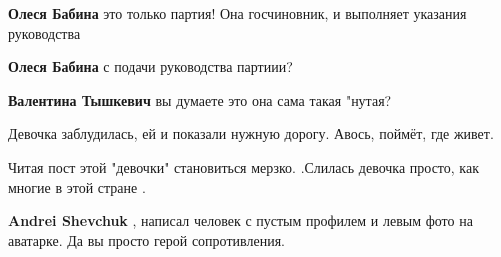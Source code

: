 \begin{itemize}
\begin{itemize}
 
\textbf{Олеся Бабина} это только партия! Она госчиновник, и выполняет указания руководства

 
\textbf{Олеся Бабина} с подачи руководства партиии?

 
\textbf{Валентина Тышкевич} вы думаете это она сама такая "нутая?
\end{itemize}

 
Девочка заблудилась, ей и показали нужную дорогу. Авось, поймёт, где живет.

 
Читая пост этой "девочки" становиться мерзко. .Слилась девочка просто, как многие в этой стране .

\begin{itemize}
 
\textbf{Andrei Shevchuk} , написал человек с пустым профилем и левым фото на аватарке.
Да вы просто герой сопротивления.


\end{itemize}
\end{itemize}
